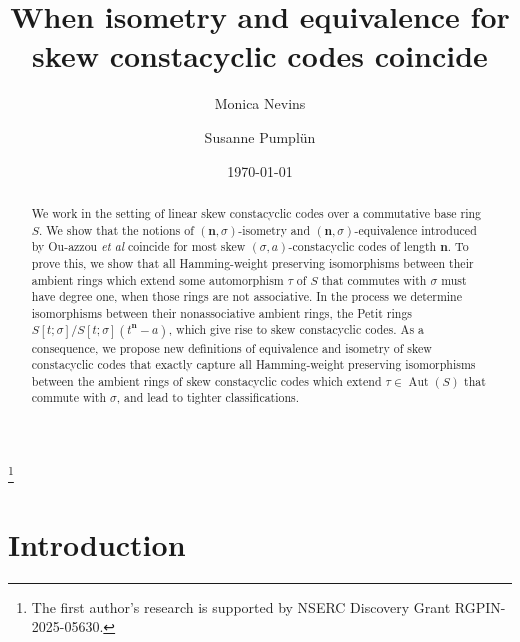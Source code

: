 \documentclass[11pt]{amsart}
\theoremstyle{plain}
\theoremstyle{definition}
\numberwithin{equation}{section}
\numberwithin{figure}{section}
\newcommand{\Sone}[1]{\Stsigma/\Stsigma (t^{\de}-#1)} %
\newcommand{\Stsigma}{S[t;\sigma]}
\newcommand{\de}{\mathbf{n}}  %
\DeclareMathOperator{\Aut}{Aut}
\begin{document}
\title[Isometry and equivalence]{When isometry and equivalence for skew constacyclic codes coincide}


\author{Monica Nevins}
\address{Department of Mathematics and Statistics, University of Ottawa, Ottawa, Canada K1N 6N5}
\thanks{The first author's research is supported by NSERC Discovery Grant RGPIN-2025-05630.}


\author{Susanne Pumpl\"un}
\address{School of Mathematical Sciences, University of Nottingham,
Nottingham NG7 2RD}




\date{\today}



\begin{abstract}
We work in the  setting of %
linear skew constacyclic codes over a commutative base ring $S$.
We show that the notions of $(\de,\sigma)$-isometry and $(\de,\sigma)$-equivalence introduced by Ou-azzou \emph{et al}
coincide for most skew  $(\sigma,a)$-constacyclic codes of length $\de$.  To prove this, we show that all Hamming-weight preserving isomorphisms between their ambient rings which extend some automorphism $\tau$ of $S$ that commutes with $\sigma$ must have degree one, when those rings are not associative.   In the process we determine  isomorphisms between their nonassociative ambient rings, the Petit rings %
$\Sone{a}$, which give rise to skew constacyclic codes.  As a consequence, we  propose new definitions of equivalence and isometry of skew constacyclic codes that exactly capture all  Hamming-weight preserving isomorphisms between the ambient rings of  skew constacyclic codes which extend  $\tau\in \Aut(S)$ that commute with $\sigma$, and lead to tighter classifications.
\end{abstract}



\maketitle

\section{Introduction}
\end{document}
